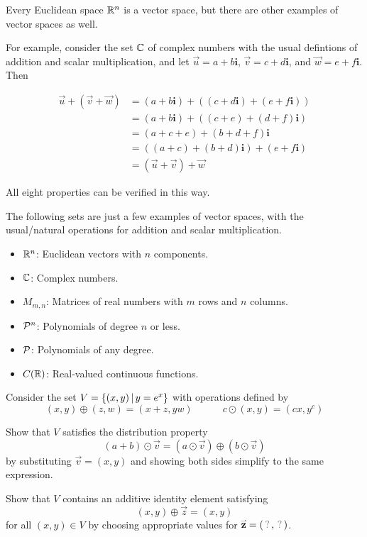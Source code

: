 \begin{remark}
  Every Euclidean space \(\IR^n\) is a vector space, but there are other
  examples of vector spaces as well. 

  \vspace{1em}
  
  For example, consider the
  set \(\IC\) of complex numbers with the usual defintions of
  addition and scalar multiplication, and let 
  \(\vec u=a+b\mathbf{i}\), \(\vec v=c+d\mathbf{i}\), and \(\vec w=e+f\mathbf{i}\). Then

  \begin{align*}
    \vec u+(\vec v+\vec w)
      &=
    (a+b\mathbf{i})+((c+d\mathbf{i})+(e+f\mathbf{i}))
      \\&=
    (a+b\mathbf{i})+((c+e)+(d+f)\mathbf{i})
	\\&=(a+c+e)+(b+d+f)\mathbf{i}
    \\&=((a+c)+(b+d)\mathbf{i})+(e+f\mathbf{i})
      \\&=
    (\vec u+\vec v)+\vec w
  \end{align*}

  All eight properties can be verified in this way.
\end{remark}

\begin{remark}
  The following sets are just a few examples of vector spaces, with the usual/natural
  operations for addition and scalar multiplication.
  \begin{itemize}
    \item \(\IR^n\): Euclidean vectors with \(n\) components.
    \item \(\IC\): Complex numbers.
    \item \(M_{m,n}\): Matrices of real numbers with \(m\) rows and
          \(n\) columns.
    \item \(\P^n\): Polynomials of degree \(n\) or less.
    \item \(\P\): Polynomials of any degree.
    \item \(C(\IR)\): Real-valued continuous functions.
  \end{itemize}
\end{remark}

\begin{activity}{20}
  Consider the set \(V=\setBuilder{(x,y)}{y=e^x}\) with operations defined by
  \[
    (x,y)\oplus (z,w)=(x+z,yw)
      \hspace{3em}
    c\odot (x,y)=(cx,y^c)
  \]
  \begin{subactivity}
  Show that \(V\) satisfies the distribution property
  \[(a+b)\odot\vec v=(a\odot\vec v)\oplus (b\odot\vec v)\]
  by substituting \(\vec v=(x,y)\) and showing both sides simplify to the same
  expression.
  \end{subactivity}
  \begin{subactivity}%
  Show that \(V\) contains an additive identity element satisfying
  \[(x,y)\oplus\vec{z}=(x,y)\]
  for all \((x,y)\in V\)
  by choosing appropriate values for \(\vec{z}=(\unknown,\unknown)\). 
  \end{subactivity}
\end{activity}


